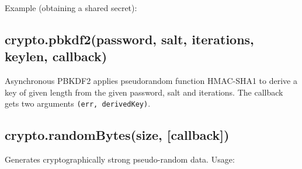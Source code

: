 Example (obtaining a shared secret):

\begin{Shaded}
\begin{Highlighting}[]
 \NormalTok{);}
 \NormalTok{(}\NormalTok{);}
 \NormalTok{(}\NormalTok{);}

\NormalTok{();}
\NormalTok{();}

 \NormalTok{(}\NormalTok{(), }\NormalTok{, }\NormalTok{);}
 \NormalTok{(}\NormalTok{(), }\NormalTok{, }\NormalTok{);}

\end{Highlighting}
\end{Shaded}

\subsection{crypto.pbkdf2(password, salt, iterations, keylen, callback)}

Asynchronous PBKDF2 applies pseudorandom function HMAC-SHA1 to derive a
key of given length from the given password, salt and iterations. The
callback gets two arguments \texttt{(err, derivedKey)}.

\subsection{crypto.randomBytes(size, {[}callback{]})}

Generates cryptographically strong pseudo-random data. Usage:


